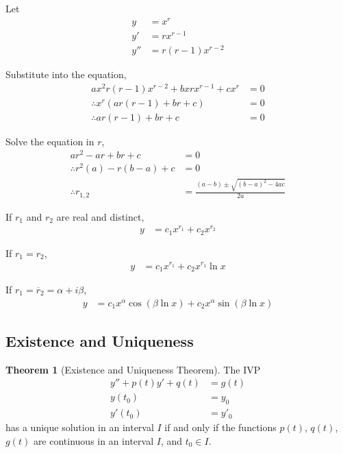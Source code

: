 \documentclass[fleqn, a4paper, 12pt, twoside]{article}
\theoremstyle{definition}
\theoremstyle{theorem}
\newtheorem{theorem}{Theorem}
\begin{document}
\begin{algorithmic}[1]
	\item
		Let
		\begin{align*}
			y   & = x^r         \\
			y'  & = r x^{r - 1} \\
			y'' & = r (r - 1) x^{r - 2}
		\end{align*}
	\item
		Substitute into the equation,
		\begin{align*}
			a x^2 r (r - 1) x^{r - 2} + b x r x^{r - 1} + c x^r & = 0 \\
			\therefore x^r \left( a r (r - 1) + b r + c \right) & = 0 \\
			\therefore a r (r - 1) + b r + c                    & = 0
		\end{align*}
	\item
		Solve the equation in $r$,
		\begin{align*}
			a r^2 - a r + b r + c &= 0\\
			\therefore r^2 (a) - r (b - a) + c &= 0\\
			\therefore r_{1,2} &= \frac{(a - b) \pm \sqrt{(b - a)^2 - 4 a c}}{2 a}
		\end{align*}

		\item
			If $r_1$ and $r_2$ are real and distinct,
			\begin{align*}
				y &= c_1 x^{r_1} + c_2 x^{r_2}
			\end{align*}
		\item
			If $r_1 = r_2$,
			\begin{align*}
				y &= c_1 x^{r_1} + c_2 x^{r_1} \ln x
			\end{align*}
		\item
			If $r_1 = \overline r_2 = \alpha + i \beta$,
			\begin{align*}
				y &= c_1 x^{\alpha} \cos(\beta \ln x) + c_2 x^{\alpha} \sin(\beta \ln x)
			\end{align*}
\end{algorithmic}

\subsection{Existence and Uniqueness}

\begin{theorem}[Existence and Uniqueness Theorem]
	The IVP
	\begin{align*}
		y'' + p(t) y' + q(t) &= g(t)\\
		y(t_0) &= y_0\\
		y'(t_0) &=y'_0
	\end{align*}
	has a unique solution in an interval $I$ if and only if the functions $p(t)$, $q(t)$, $g(t)$ are continuous in an interval $I$, and $t_0 \in I$.
\end{theorem}
\end{document}
